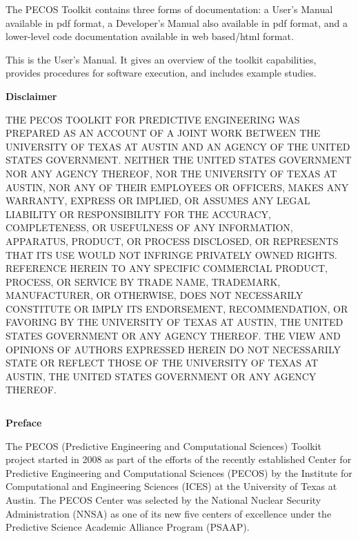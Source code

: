 The PECOS Toolkit contains three forms of documentation:
a User's Manual available in pdf format,
a Developer's Manual also available in pdf format, and
a lower-level code documentation available in web based/html format.

This is the User's Manual.
It gives an overview of the toolkit capabilities,
provides procedures for software execution, and includes example studies.

\clearpage
\centerline{\Large\bf Disclaimer}
$~$\\
    THE PECOS TOOLKIT FOR PREDICTIVE ENGINEERING WAS PREPARED AS AN ACCOUNT OF A JOINT WORK
    BETWEEN THE UNIVERSITY OF TEXAS AT AUSTIN AND AN AGENCY OF THE UNITED STATES GOVERNMENT.
    NEITHER THE UNITED STATES GOVERNMENT NOR ANY AGENCY THEREOF, NOR THE UNIVERSITY OF TEXAS
    AT AUSTIN, NOR ANY OF THEIR EMPLOYEES OR OFFICERS, MAKES ANY WARRANTY, EXPRESS OR IMPLIED,
    OR ASSUMES ANY LEGAL LIABILITY OR RESPONSIBILITY FOR THE ACCURACY, COMPLETENESS, OR
    USEFULNESS OF ANY INFORMATION, APPARATUS, PRODUCT, OR PROCESS DISCLOSED, OR REPRESENTS
    THAT ITS USE WOULD NOT INFRINGE PRIVATELY OWNED RIGHTS. REFERENCE HEREIN TO ANY SPECIFIC
    COMMERCIAL PRODUCT, PROCESS, OR SERVICE BY TRADE NAME, TRADEMARK, MANUFACTURER, OR OTHERWISE,
    DOES NOT NECESSARILY CONSTITUTE OR IMPLY ITS ENDORSEMENT, RECOMMENDATION, OR FAVORING BY
    THE UNIVERSITY OF TEXAS AT AUSTIN, THE UNITED STATES GOVERNMENT OR ANY AGENCY THEREOF.
    THE VIEW AND OPINIONS OF AUTHORS EXPRESSED HEREIN DO NOT NECESSARILY STATE OR REFLECT
    THOSE OF THE UNIVERSITY OF TEXAS AT AUSTIN, THE UNITED STATES GOVERNMENT OR ANY AGENCY
    THEREOF.

\clearpage
{\markboth{}{}
}
\tableofcontents

\clearpage
$~$

\clearpage
\thispagestyle{empty}
\centerline{\Large\bf Preface}
$~$\\
The PECOS (Predictive Engineering and Computational Sciences) Toolkit project started in 2008 as part
of the efforts of the recently established Center for Predictive Engineering and Computational Sciences (PECOS)
by the Institute for Computational and Engineering Sciences (ICES) at the University of Texas at Austin.
The PECOS Center was selected by the National Nuclear Security Administration (NNSA) as one of its new five centers of excellence
under the Predictive Science Academic Alliance Program (PSAAP).

